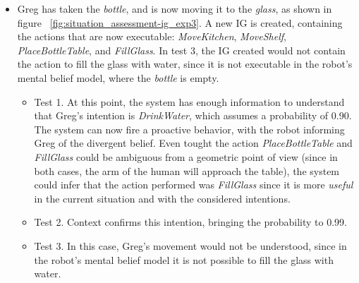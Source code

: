 \begin{itemize}
\begin{itemize}
		\end{itemize} 
	\item Greg has taken the \textit{bottle}, and is now moving it to the \textit{glass}, as shown in figure ~\ref{fig:situation_assessment-ig_exp3}. A new IG is created, containing the actions that are now executable: \textit{MoveKitchen}, \textit{MoveShelf}, \textit{PlaceBottleTable}, and \textit{FillGlass}. In test 3, the IG created would not contain the action to fill the glass with water, since it is not executable in the robot's mental belief model, where the \textit{bottle} is empty.
		\begin{itemize}
			\item Test 1. At this point, the system has enough information to understand that Greg's intention is \textit{DrinkWater}, which assumes a probability of 0.90. The system can now fire a proactive behavior, with the robot informing Greg of the divergent belief. Even tought the action \textit{PlaceBottleTable} and \textit{FillGlass} could be ambiguous from a geometric point of view (since in both cases, the arm of the human will approach the table), the system could infer that the action performed was \textit{FillGlass} since it is more \textit{useful} in the current situation and with the considered intentions.
			\item Test 2. Context confirms this intention, bringing the probability to 0.99.
			\item Test 3. In this case, Greg's movement would not be understood, since in the robot's mental belief model it is not possible to fill the glass with water.
		\end{itemize}
\end{itemize}

